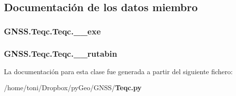 \subsection{Documentación de los datos miembro}
\subsubsection[{\-\_\-\-\_\-exe}]{\setlength{\rightskip}{0pt plus 5cm}G\-N\-S\-S.\-Teqc.\-Teqc.\-\_\-\-\_\-exe\hspace{0.3cm}{\ttfamily [private]}}\label{classGNSS_1_1Teqc_1_1Teqc_a4d305440444d3a218a896892878d1eaa}
\subsubsection[{\-\_\-\-\_\-rutabin}]{\setlength{\rightskip}{0pt plus 5cm}G\-N\-S\-S.\-Teqc.\-Teqc.\-\_\-\-\_\-rutabin\hspace{0.3cm}{\ttfamily [private]}}\label{classGNSS_1_1Teqc_1_1Teqc_a5781e29f2389186a97a8a6936a103894}


La documentación para esta clase fue generada a partir del siguiente fichero\-:\begin{DoxyCompactItemize}
\item 
/home/toni/\-Dropbox/py\-Geo/\-G\-N\-S\-S/{\bf Teqc.\-py}\end{DoxyCompactItemize}
